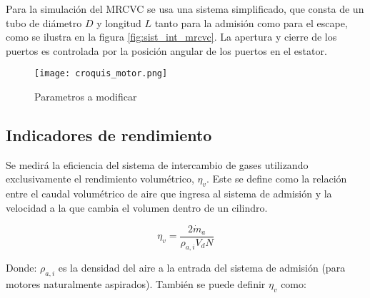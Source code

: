 
Para la simulación del MRCVC se usa una sistema simplificado, que consta de un
tubo de diámetro $D$ y longitud $L$ tanto para la admisión como para el escape,
como se ilustra en la figura \ref{fig:sist_int_mrcvc}.
%
La apertura y cierre de los puertos es controlada por la posición angular de los
puertos en el estator.

\begin{figure}
    \centering
    \texttt{[image: croquis\_motor.png]}
    \caption{Parametros a modificar}
    \label{fig:croquis_mrcvc}
\end{figure}


\subsection{Indicadores de rendimiento}
\label{sec:indicadores_rendimiento}

Se medirá la eficiencia del sistema de intercambio de gases utilizando
exclusivamente el rendimiento volumétrico, $\eta_v$.
%
Este se define como la relación entre el caudal volumétrico de aire que ingresa
al sistema de admisión y la velocidad a la que cambia el volumen dentro de un
cilindro.


\begin{equation}
  \label{eq:rendVol}
  \eta_v = \frac{2 \dot{m}_a}{\rho_{a,i} V_d N}
\end{equation}

Donde: $\rho_{a,i}$ es la densidad del aire a la entrada del sistema de
admisión (para motores naturalmente aspirados). También se puede definir
$\eta_v$ como:

